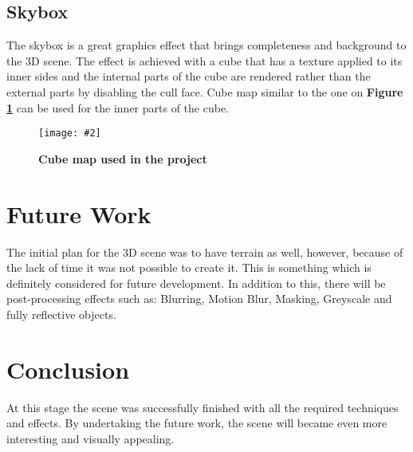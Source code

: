 \documentclass[10pt, a4paper]{article}
\newcommand{\figuremacro}[5]{
    \begin{figure}[#1]
        \centering
        \texttt{[image: \#2]}
        \caption[#3]{\textbf{#3}#4}
        \label{fig:#2}
    \end{figure}
}
\begin{document}
	\subsection{Skybox}
	The skybox is a great graphics effect that brings completeness and background to the 3D scene. The effect is achieved with a cube that has a texture applied to its inner sides and the internal parts of the cube are rendered rather than the external parts by disabling the cull face. Cube map similar to the one on \textbf{Figure {\ref{fig:skybox}}} can be used for the inner parts of the cube.
	\figuremacro{h}{skybox}{Cube map used in the project}{ }{0.9}	
	\section{Future Work}
	The initial plan for the 3D scene was to have terrain as well, however, because of the lack of time it was not possible to create it. This is something which is definitely considered  for future development. In addition to this, there will be post-processing effects such as: Blurring, Motion Blur, Masking, Greyscale and fully reflective objects. 
	\section{Conclusion}
	At this stage the scene was successfully finished with all the required techniques and effects. By undertaking the future work, the scene will became even more interesting and visually appealing.	


		
\end{document}
